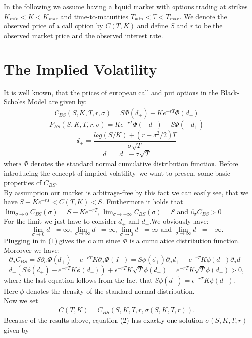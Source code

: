 \documentclass[12pt]{article}
\newcommand{\C}{C_{BS}}
\newcommand{\p}{\partial}
\begin{document}
\tableofcontents
\newpage


In the following we assume having a liquid market with options trading at strikes $K_{min}<K<K_{max}$ and time-to-maturities $T_{min}<T<T_{max}$. We denote the observed price of a call option by $C(T,K)$ and define $S$ and $r$ to be the observed market price and the observed interest rate.

\section{The Implied Volatility}

It is well known, that the prices of european call and put options in the Black-Scholes Model are given by:
\begin{align}
C_{BS}(S,K,T,r,\sigma)=S\Phi(d_+)-Ke^{-rT}\Phi(d_-)
\end{align}
$$P_{BS}(S,K,T,r,\sigma)=Ke^{-rT}\Phi(-d_-)-S\Phi(-d_+)$$
$$d_+=\frac{log(S/K)+(r+\sigma^2/2)T}{\sigma\sqrt{T}}$$
$$d_-=d_+-\sigma\sqrt{T}$$
where $\Phi$ denotes the standard normal cumulative distribution function.
Before introducing the concept of implied volatility, we want to present some basic properties of $C_{BS}$.\\
By assumption our market is arbitrage-free by this fact we can easily see, that we have $S-Ke^{-rT}<C(T,K)<S$.
Furthermore it holds that $\lim_{\sigma\rightarrow 0}C_{BS}(\sigma)=S-Ke^{-rT}$, $\lim_{\sigma\rightarrow +\infty}C_{BS}(\sigma)=S$ and
$\partial_\sigma C_{BS}>0$\\
For the limit we just have to consider $d_+$ and $d_-$.We obviously have: $$\lim_{\sigma\rightarrow 0} d_+= \infty,\lim_{\sigma\rightarrow \infty} d_+= \infty, \lim_{\sigma\rightarrow 0} d_-= \infty \text{ and }\lim_{\sigma\rightarrow \infty} d_-= -\infty .$$
Plugging in in (1) gives the claim since $\Phi$ is a cumulatice distribution function. Moreover we have:
$$\p_\sigma\C=S\p_\sigma\Phi(d_+)-e^{-rT}K\p_\sigma\Phi(d_-)=S\phi(d_+)\p_\sigma d_+-e^{-rT}K\phi(d_-)\p_\sigma d_- $$
$$d_+(S\phi(d_+)-e^{-rT}K\phi(d_-))+e^{-rT}K\sqrt{T}\phi(d_-)=e^{-rT}K\sqrt{T}\phi(d_-)>0,$$
where the last equation follows from the fact that $S\phi(d_+)=e^{-rT}K\phi(d_-)$. Here $\phi$ denotes the density of the standard normal distribution.\\
Now we set
\begin{align}
C(T,K)=\C(S,K,T,r,\sigma(S,K,T,r)).
\end{align}
Because of the results above, equation (2) has exactly one solution $\sigma(S,K,T,r)$ given by
\end{document}
